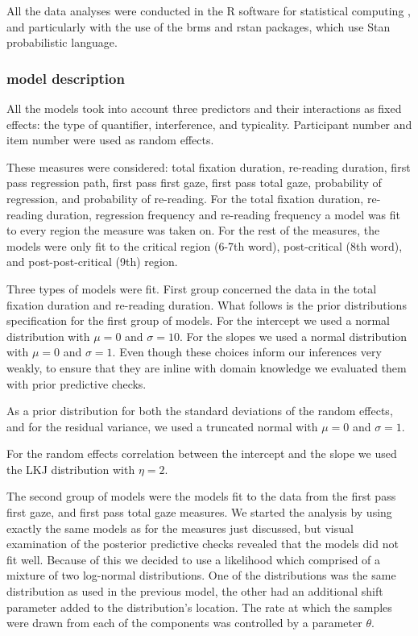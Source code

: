 All the data analyses were conducted in the R software for statistical
computing \autocite{Rcore}, and particularly with the use of the brms
\autocite{bürkner2017brms} and rstan \autocite{team2020rstan} packages,
which use Stan \autocite{stan2021} probabilistic language.

\hypertarget{model-description}{%
\subsubsection{model description}\label{model-description}}

All the models took into account three predictors and their interactions
as fixed effects: the type of quantifier, interference, and typicality.
Participant number and item number were used as random effects.

These measures were considered: total fixation duration, re-reading
duration, first pass regression path, first pass first gaze, first pass
total gaze, probability of regression, and probability of re-reading.
For the total fixation duration, re-reading duration, regression
frequency and re-reading frequency a model was fit to every region the
measure was taken on. For the rest of the measures, the models were only
fit to the critical region (6-7th word), post-critical (8th word), and
post-post-critical (9th) region.

Three types of models were fit. First group concerned the data in the
total fixation duration and re-reading duration. What follows is the
prior distributions specification for the first group of models. For the
intercept we used a normal distribution with \(\mu = 0\) and
\(\sigma = 10\). For the slopes we used a normal distribution with
\(\mu = 0\) and \(\sigma = 1\). Even though these choices inform our
inferences very weakly, to ensure that they are inline with domain
knowledge we evaluated them with prior predictive checks.

As a prior distribution for both the standard deviations of the random
effects, and for the residual variance, we used a truncated normal with
\(\mu = 0\) and \(\sigma = 1\).

For the random effects correlation between the intercept and the slope
we used the LKJ distribution \autocite{lewandowski2009gener,stan2021}
with \(\eta = 2\).

The second group of models were the models fit to the data from the
first pass first gaze, and first pass total gaze measures. We started
the analysis by using exactly the same models as for the measures just
discussed, but visual examination of the posterior predictive checks
revealed that the models did not fit well. Because of this we decided to
use a likelihood which comprised of a mixture of two log-normal
distributions. One of the distributions was the same distribution as
used in the previous model, the other had an additional shift parameter
added to the distribution's location. The rate at which the samples were
drawn from each of the components was controlled by a parameter
\(\theta\).

